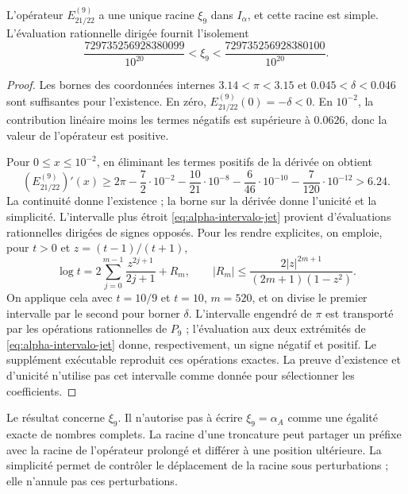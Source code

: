 \begin{proposition}
\label{prop:alpha-raiz-jet}
L’opérateur \(E_{21/22}^{(9)}\) a une unique racine
\(\xi_9\) dans \(I_\alpha\), et cette racine est simple. L’évaluation rationnelle dirigée fournit l’isolement
\begin{equation}
 \frac{729735256928380099}{10^{20}}
 <\xi_9<\frac{729735256928380100}{10^{20}}.
 \label{eq:alpha-intervalo-jet}
\end{equation}
\end{proposition}

\begin{proof}
Les bornes des coordonnées internes
\(3.14<\pi<3.15\) et
\(0.045<\delta<0.046\) sont suffisantes pour l'existence. En zéro,
\(E_{21/22}^{(9)}(0)=-\delta<0\). En \(10^{-2}\), la contribution
linéaire moins les termes négatifs est supérieure à \(0.0626\), donc la
valeur de l'opérateur est positive.

Pour \(0\leq x\leq10^{-2}\), en éliminant les termes positifs de
la dérivée on obtient
\[
 (E_{21/22}^{(9)})'(x)
 \geq2\pi-\frac72\cdot10^{-2}
 -\frac{10}{21}\cdot10^{-8}-\frac6{46}\cdot10^{-10}
 -\frac7{120}\cdot10^{-12}>6.24.
\]
La continuité donne l’existence ; la borne sur la dérivée donne l’unicité et
la simplicité. L’intervalle plus étroit
\eqref{eq:alpha-intervalo-jet} provient d’évaluations rationnelles dirigées de signes opposés. Pour les rendre
explicites, on emploie, pour \(t>0\) et \(z=(t-1)/(t+1)\),
\[
 \log t=2\sum_{j=0}^{m-1}\frac{z^{2j+1}}{2j+1}+R_m,
 \qquad |R_m|\leq\frac{2|z|^{2m+1}}{(2m+1)(1-z^2)}.
\]
On applique cela avec \(t=10/9\) et \(t=10\), \(m=520\), et on divise
le premier intervalle par le second pour borner \(\delta\). L’intervalle
engendré de \(\pi\) est transporté par les opérations rationnelles de
\(P_9\) ; l’évaluation aux deux extrémités de
\eqref{eq:alpha-intervalo-jet} donne, respectivement, un signe négatif et
positif. Le supplément exécutable reproduit ces opérations exactes.
La preuve d’existence et d’unicité n’utilise pas cet intervalle comme donnée
pour sélectionner les coefficients.
\end{proof}

Le résultat concerne \(\xi_9\). Il n'autorise pas à écrire \(\xi_9=\alpha_A\) comme une égalité exacte de nombres complets. La racine d'une troncature peut partager un préfixe avec la racine de l'opérateur prolongé et différer à une position ultérieure. La simplicité permet de contrôler le déplacement de la racine sous perturbations ; elle n'annule pas ces perturbations.


